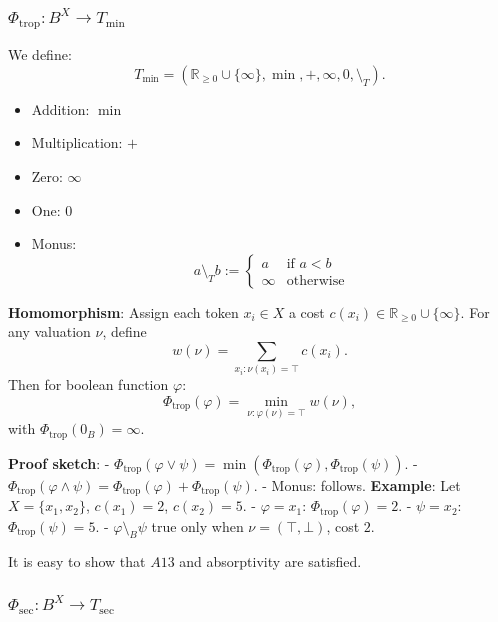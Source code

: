 \subsubsection{$\Phi_{\mathrm{trop}}: B^X \to T_{\min}$}

We define:
$$
T_{\min} = (\mathbb{R}_{\ge 0} \cup \{\infty\},\min,+,\infty,0,\setminus_T).
$$
\begin{itemize}
    \item Addition: \(\min\)
    \item Multiplication: \(+\)
    \item Zero: \(\infty\)
    \item One: \(0\)
    \item Monus:
    \[
    a \setminus_T b :=
    \begin{cases}
        a & \text{if } a < b \\
        \infty & \text{otherwise}
    \end{cases}
    \]
\end{itemize}



\textbf{Homomorphism}:\newline
Assign each token \(x_i\in X\) a cost \(c(x_i)\in\mathbb{R}_{\ge0}\cup\{\infty\}\). For any valuation \(\nu\), define
$$
w(\nu) = \sum_{x_i:\nu(x_i)=\top} c(x_i).
$$
Then for boolean function  \(\varphi\):
$$
\Phi_{\mathrm{trop}}(\varphi) 
= \min_{\nu:\varphi(\nu)=\top} w(\nu),
$$
with \(\Phi_{\mathrm{trop}}(0_B)=\infty\).
\newline

\textbf{Proof sketch}: \newline
- \(\Phi_{\mathrm{trop}}(\varphi \vee \psi) = \min(\Phi_{\mathrm{trop}}(\varphi), \Phi_{\mathrm{trop}}(\psi))\).  
- \(\Phi_{\mathrm{trop}}(\varphi \wedge \psi) = \Phi_{\mathrm{trop}}(\varphi) + \Phi_{\mathrm{trop}}(\psi)\).  
- Monus: follows. \newline
\textbf{Example}: \newline
Let \(X=\{x_1,x_2\}\), \(c(x_1)=2\), \(c(x_2)=5\).  
- \(\varphi = x_1\): \(\Phi_{\mathrm{trop}}(\varphi)=2\).  
- \(\psi = x_2\): \(\Phi_{\mathrm{trop}}(\psi)=5\).  
- \(\varphi \setminus_B \psi\) true only when \(\nu=(\top,\bot)\), cost \(2\).

It is easy to show that $A13$ and absorptivity are satisfied.


\subsubsection{$\Phi_{\mathrm{sec}}: B^X \to T_{\sec}$}

